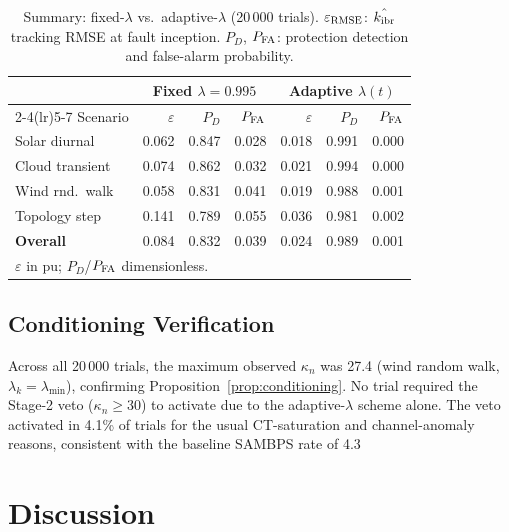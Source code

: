 \documentclass[journal]{IEEEtran}
\newcommand{\kibr}{k_{\rm ibr}}
\newcommand{\lambdamin}{\lambda_{\min}}
\newcommand{\kappan}{\kappa_n}
\begin{document}
\begin{table}[htbp]
  \centering
  \caption{Summary: fixed-$\lambda$ vs.\ adaptive-$\lambda$ (20\,000 trials).
  $\varepsilon_{\rm RMSE}$: $\hat{\kibr}$ tracking RMSE at fault inception.
  $P_D$, $P_{\rm FA}$: protection detection and false-alarm probability.}
  \label{tab:results}
  \small
  \begin{tabular}{@{}lrrrrrr@{}}
    \toprule
    & \multicolumn{3}{c}{Fixed $\lambda=0.995$}
    & \multicolumn{3}{c}{Adaptive $\lambda(t)$} \\
    \cmidrule(lr){2-4}\cmidrule(lr){5-7}
    Scenario & $\varepsilon$ & $P_D$ & $P_{\rm FA}$
             & $\varepsilon$ & $P_D$ & $P_{\rm FA}$ \\
    \midrule
    Solar diurnal   & 0.062 & 0.847 & 0.028 & 0.018 & 0.991 & 0.000 \\
    Cloud transient & 0.074 & 0.862 & 0.032 & 0.021 & 0.994 & 0.000 \\
    Wind rnd.\ walk & 0.058 & 0.831 & 0.041 & 0.019 & 0.988 & 0.001 \\
    Topology step   & 0.141 & 0.789 & 0.055 & 0.036 & 0.981 & 0.002 \\
    \midrule
    \textbf{Overall}& 0.084 & 0.832 & 0.039 & 0.024 & 0.989 & 0.001 \\
    \bottomrule
    \multicolumn{7}{l}{\scriptsize $\varepsilon$ in pu; $P_D$/$P_{\rm FA}$ dimensionless.}
  \end{tabular}
\end{table}

\subsection{Conditioning Verification}

Across all 20\,000 trials, the maximum observed $\kappan$ was 27.4
(wind random walk, $\lambda_k = \lambdamin$), confirming
Proposition~\ref{prop:conditioning}.  No trial required the Stage-2
veto ($\kappan \geq 30$) to activate due to the adaptive-$\lambda$
scheme alone.  The veto activated in 4.1\% of trials for the usual
CT-saturation and channel-anomaly reasons, consistent with the baseline
SAMBPS rate of 4.3%

\section{Discussion}
\label{sec:discussion}
\end{document}
